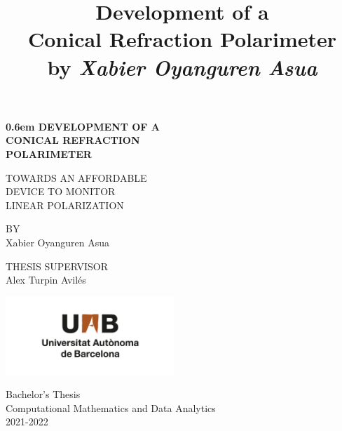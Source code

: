 \documentclass[11pt, a4paper, twoside]{article} %
\title{\vspace{-2cm} {\bf Development of a \\Conical Refraction Polarimeter}\\{\small by {\em Xabier Oyanguren Asua}}\vspace{-0.8cm}}
\date{\vspace{-11ex}}
\begin{document}
\clearpage
\newcommand\nbvspace[1][3]{\vspace*{\stretch{#1}}}
\newcommand\nbstretchyspace{\spaceskip0.5em plus 0.25em minus 0.25em}
\newcommand{\nbtitlestretch}{\spaceskip0.6em}
\pagestyle{empty}
\begin{center}
\bfseries
\nbvspace[1]
\Huge
{\nbtitlestretch
{\normalsize DEVELOPMENT OF A }\\
\Huge CONICAL REFRACTION \\
POLARIMETER }

\nbvspace[4]
{\small

TOWARDS AN AFFORDABLE\vspace{0.2cm}\\  DEVICE TO MONITOR\vspace{0.2cm}\\ LINEAR POLARIZATION\\
}

\normalsize

\nbvspace[5]
\small BY\\
\Large Xabier Oyanguren Asua\\[0.5em]

\nbvspace[5]

\small THESIS SUPERVISOR \vspace{0.15cm}\\
\Large Alex Turpin Avilés

\nbvspace[1]

\includegraphics[width=2.5in]{UAB.png}
\normalsize
\vspace{-0.5cm}

\large
\small
Bachelor's Thesis \\ Computational Mathematics and Data Analytics \\
\vspace{0.1cm}
\small
2021-2022
\nbvspace[1]
\end{center}
\end{document}
